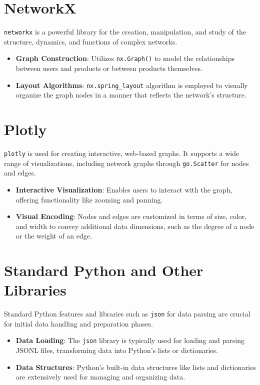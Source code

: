 \documentclass[fontsize=11pt]{article}
\begin{document}
\section*{NetworkX}

\texttt{networkx} is a powerful library for the creation, manipulation, and study of the structure, dynamics, and functions of complex networks.

\begin{itemize}
    \item \textbf{Graph Construction}: Utilizes \texttt{nx.Graph()} to model the relationships between users and products or between products themselves. 
    \item \textbf{Layout Algorithms}: \texttt{nx.spring\_layout} algorithm is employed to visually organize the graph nodes in a manner that reflects the network's structure.
\end{itemize}

\section*{Plotly}

\texttt{plotly} is used for creating interactive, web-based graphs. It supports a wide range of visualizations, including network graphs through \texttt{go.Scatter} for nodes and edges.

\begin{itemize}
    \item \textbf{Interactive Visualization}: Enables users to interact with the graph, offering functionality like zooming and panning.
    \item \textbf{Visual Encoding}: Nodes and edges are customized in terms of size, color, and width to convey additional data dimensions, such as the degree of a node or the weight of an edge.
\end{itemize}

\section*{Standard Python and Other Libraries}

Standard Python features and libraries such as \texttt{json} for data parsing are crucial for initial data handling and preparation phases.

\begin{itemize}
    \item \textbf{Data Loading}: The \texttt{json} library is typically used for loading and parsing JSONL files, transforming data into Python's lists or dictionaries.
    \item \textbf{Data Structures}: Python's built-in data structures like lists and dictionaries are extensively used for managing and organizing data.
\end{itemize}
\end{document}
